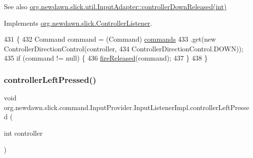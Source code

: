 \begin{DoxySeeAlso}{See also}
\mbox{\hyperlink{classorg_1_1newdawn_1_1slick_1_1util_1_1_input_adapter_a6cb307438dc81cba0ec7a9f6b4dbc887}{org.\+newdawn.\+slick.\+util.\+Input\+Adapter\+::controller\+Down\+Released(int)}} 
\end{DoxySeeAlso}


Implements \mbox{\hyperlink{interfaceorg_1_1newdawn_1_1slick_1_1_controller_listener_a7d0ca99c8cd5b0d332bece1d17befee7}{org.\+newdawn.\+slick.\+Controller\+Listener}}.


\begin{DoxyCode}
431                                                            \{
432             Command command = (Command) \mbox{\hyperlink{classorg_1_1newdawn_1_1slick_1_1command_1_1_input_provider_ab2bd0c08506a59bc7457d7a87cf873d2}{commands}}
433                     .\textcolor{keyword}{get}(\textcolor{keyword}{new} ControllerDirectionControl(controller,
434                             ControllerDirectionControl.DOWN));
435             \textcolor{keywordflow}{if} (command != null) \{
436                 \mbox{\hyperlink{classorg_1_1newdawn_1_1slick_1_1command_1_1_input_provider_afede03e3ab95cb0248635cf64de6874c}{fireReleased}}(command);
437             \}
438         \}
\end{DoxyCode}
\mbox{\label{classorg_1_1newdawn_1_1slick_1_1command_1_1_input_provider_1_1_input_listener_impl_a63696617ddee4b5ae49ab7bd892d14ee}} 
\subsubsection{\texorpdfstring{controller\+Left\+Pressed()}{controllerLeftPressed()}}
{\footnotesize\ttfamily void org.\+newdawn.\+slick.\+command.\+Input\+Provider.\+Input\+Listener\+Impl.\+controller\+Left\+Pressed (\begin{DoxyParamCaption}\item[{int}]{controller }\end{DoxyParamCaption})\hspace{0.3cm}{\ttfamily [inline]}}

